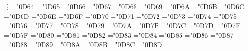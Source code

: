 \mathchardef\vdots ="0D64
\let\mVerticalEllipsis=\vdots 
\mathchardef\cdots ="0D65
\let\mCenterEllipsis=\cdots 
\mathchardef\AscendingEllipsis ="0D66
\let\mAscendingEllipsis=\AscendingEllipsis 
\mathchardef\ddots ="0D67
\let\mDescendingEllipsis=\ddots 
\mathchardef\prime ="0D68
\let\mPrime=\prime 
\mathchardef\DoublePrime ="0D69
\let\mDoublePrime=\DoublePrime 
\mathchardef\ReversePrime ="0D6A
\let\mReversePrime=\ReversePrime 
\mathchardef\ReverseDoublePrime ="0D6B
\let\mReverseDoublePrime=\ReverseDoublePrime 
\mathchardef\forall ="0D6C
\let\mForAll=\forall 
\mathchardef\exists ="0D6D
\let\mExists=\exists 
\mathchardef\nexists ="0D6E
\let\mNotExists=\nexists 
\mathchardef\in ="0D6F
\let\mElement=\in 
\mathchardef\notin ="0D70
\let\mNotElement=\notin 
\mathchardef\ni ="0D71
\let\mReverseElement=\ni 
\mathchardef\NotReverseElement ="0D72
\let\mNotReverseElement=\NotReverseElement 
\mathchardef\because ="0D73
\let\mBecause=\because 
\mathchardef\SuchThat ="0D74
\let\mSuchThat=\SuchThat 
\mathchardef\VerticalSeparator ="0D75
\let\mVerticalSeparator=\VerticalSeparator 
\mathchardef\therefore ="0D76
\let\mTherefore=\therefore 
\mathchardef\Rightarrow ="0D77
\let\mImplies=\Rightarrow 
\mathchardef\RoundImplies ="0D78
\let\mRoundImplies=\RoundImplies 
\mathchardef\Tilde ="0D79
\let\mTilde=\Tilde 
\mathchardef\nsim ="0D7A
\let\mNotTilde=\nsim 
\mathchardef\EqualTilde ="0D7B
\let\mEqualTilde=\EqualTilde 
\mathchardef\simeq ="0D7C
\let\mTildeEqual=\simeq 
\mathchardef\NotTildeEqual ="0D7D
\let\mNotTildeEqual=\NotTildeEqual 
\mathchardef\cong ="0D7E
\let\mTildeFullEqual=\cong 
\mathchardef\approx ="0D7F
\let\mTildeTilde=\approx 
\mathchardef\NotTildeTilde ="0D80
\let\mNotTildeTilde=\NotTildeTilde 
\mathchardef\NotEqualTilde ="0D81
\let\mNotEqualTilde=\NotEqualTilde 
\mathchardef\NotTildeFullEqual ="0D82
\let\mNotTildeFullEqual=\NotTildeFullEqual 
\mathchardef\lesssim ="0D83
\let\mLessTilde=\lesssim 
\mathchardef\gtrsim ="0D84
\let\mGreaterTilde=\gtrsim 
\mathchardef\NotLessTilde ="0D85
\let\mNotLessTilde=\NotLessTilde 
\mathchardef\NotGreaterTilde ="0D86
\let\mNotGreaterTilde=\NotGreaterTilde 
\mathchardef\triangleleft ="0D87
\let\mLeftTriangle=\triangleleft 
\mathchardef\triangleright ="0D88
\let\mRightTriangle=\triangleright 
\mathchardef\trianglelefteq ="0D89
\let\mLeftTriangleEqual=\trianglelefteq 
\mathchardef\trianglerighteq ="0D8A
\let\mRightTriangleEqual=\trianglerighteq 
\mathchardef\LeftTriangleBar ="0D8B
\let\mLeftTriangleBar=\LeftTriangleBar 
\mathchardef\RightTriangleBar ="0D8C
\let\mRightTriangleBar=\RightTriangleBar 
\mathchardef\NotLeftTriangleBar ="0D8D
